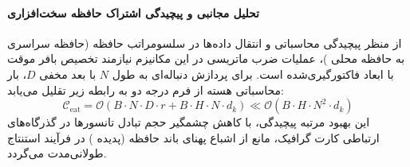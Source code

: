 \paragraph{تحلیل مجانبی و پیچیدگی اشتراک حافظه سخت‌افزاری}
از منظر پیچیدگی محاسباتی و انتقال داده‌ها در سلسومراتب حافظه (حافظه سراسری  به حافظه محلی )، عملیات ضرب ماتریسی در این مکانیزم نیازمند تخصیص بافر موقت با ابعاد فاکتورگیری‌شده است. برای پردازش دنباله‌ای به طول $N$ با بعد مخفی $D$، بار محاسباتی هسته از فرم درجه دو به رابطه زیر تقلیل می‌یابد:
\begin{equation}
\label{eq:complexity_eat}
\mathcal{C}_{\text{eat}} = \mathcal{O}\left( B \cdot N \cdot D \cdot r + B \cdot H \cdot N \cdot d_k \right) \ll \mathcal{O}\left( B \cdot H \cdot N^2 \cdot d_k \right)
\end{equation}
این بهبود مرتبه پیچیدگی، با کاهش چشمگیر حجم تبادل تانسورها در گذرگاه‌های ارتباطی کارت گرافیک، مانع از اشباع پهنای باند حافظه (پدیده ) در فرآیند استنتاج طولانی‌مدت می‌گردد.
